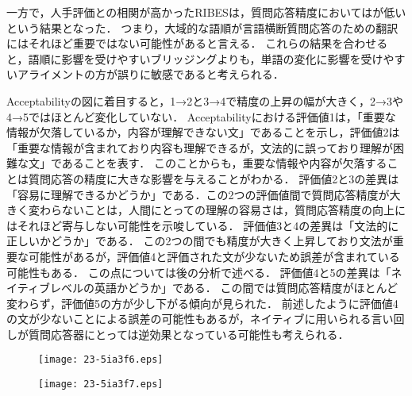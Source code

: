 \documentclass[japanese]{jnlp_1.4}
\def\hl#1{}
\begin{document}
一方で，人手評価との相関が高かったRIBESは，質問応答精度においては\hl{決定係数}が低いという結果となった．
つまり，大域的な語順が言語横断質問応答のための翻訳にはそれほど重要ではない可能性があると言える．
これらの結果を合わせると，語順に影響を受けやすいブリッジングよりも，単語の変化に影響を受けやすいアライメントの方が誤りに敏感であると考えられる．

Acceptabilityの図に着目すると，1→2と3→4で精度の上昇の幅が大きく，2→3や4→5ではほとんど変化していない．
Acceptabilityにおける評価値1は，「重要な情報が欠落しているか，内容が理解できない文」であることを示し，評価値2は「重要な情報が含まれており内容も理解できるが，文法的に誤っており理解が困難な文」であることを表す．
このことからも，重要な情報や内容が欠落することは質問応答の精度に大きな影響を与えることがわかる．
評価値2と3の差異は「容易に理解できるかどうか」である．この2つの評価値間で質問応答精度が大きく変わらないことは，人間にとっての理解の容易さは，質問応答精度の向上にはそれほど寄与しない可能性を示唆している．
評価値3と4の差異は「文法的に正しいかどうか」である．
この2つの間でも精度が大きく上昇しており文法が重要な可能性があるが，評価値4と評価された文が少ないため誤差が含まれている可能性もある．
この点については後の分析で述べる．
評価値4と5の差異は「ネイティブレベルの英語かどうか」である．
この間では質問応答精度がほとんど変わらず，評価値5の方が少し下がる傾向が見られた．
前述したように評価値4の文が少ないことによる誤差の可能性もあるが，ネイティブに用いられる言い回しが質問応答器にとっては逆効果となっている可能性も考えられる．

\begin{figure}[p]
\setlength{\captionwidth}{0.44\linewidth}
\begin{minipage}[b]{0.44\linewidth}
\begin{center}
\texttt{[image: 23-5ia3f6.eps]}
\end{center}
\label{fig:result_correct}
\end{minipage}
\hfill
\begin{minipage}[b]{0.44\linewidth}
\begin{center}
\texttt{[image: 23-5ia3f7.eps]}
\end{center}
\label{fig:result_wrong}
\end{minipage}
\end{figure}
\end{document}
